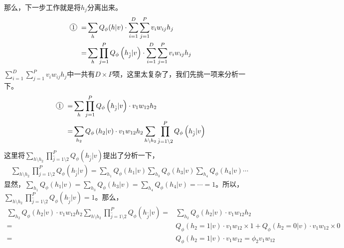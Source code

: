 \documentclass[a4paper]{article}
\newcommand*{\circled}[1]{\lower.7ex\hbox{\tikz\draw (0pt, 0pt)%
    circle (.5em) node {\makebox[1em][c]{\small #1}};}}
\begin{document}
那么，下一步工作就是将$h_j$分离出来。
\begin{equation}
    \begin{split}
        \circled{1} = & \sum_{h} Q_{\phi}(h | v) \cdot \sum_{i=1}^{D} \sum_{j=1}^{P} v_{i} w_{i j} h_{j} \\
        = & \sum_{h} \prod_{j=1}^{P} Q_{\phi}\left(h_{\hat{j}} | v\right) \cdot \sum_{i=1}^{D} \sum_{j=1}^{P} v_{i} w_{i j} h_{j}
    \end{split}
\end{equation}
$\sum_{i=1}^{D} \sum_{j=1}^{P} v_{i} w_{i j} h_{j}$中一共有$D\times P$项，这里太复杂了，我们先挑一项来分析一下。
\begin{equation}
    \begin{split}
        \circled{1} = & \sum_{h} \prod_{j=1}^{P} Q_{\phi}\left(h_{\hat{j}} | v\right) \cdot v_{1} w_{12} h_{2} \\
        = & \sum_{h_2} Q_{\phi}\left(h_{2} | v\right) \cdot v_{1} w_{12} h_{2} \sum_{h \setminus h_2} \prod_{\hat{j}=1\setminus 2}^{P} Q_{\phi}\left(h_{\hat{j}} | v\right) \\
    \end{split}
\end{equation}
这里将$\sum_{h \setminus h_2} \prod_{\hat{j}=1\setminus 2}^{P} Q_{\phi}\left(h_{\hat{j}} | v\right)$提出了分析一下，
\begin{equation}
    \begin{split}
       \sum_{h \setminus h_2} \prod_{\hat{j}=1\setminus 2}^{P} Q_{\phi}\left(h_{\hat{j}} | v\right) = \sum_{h_1} Q_{\phi}\left(h_{1} | v\right) \sum_{h_3} Q_{\phi}\left(h_{3} | v\right)\sum_{h_4} Q_{\phi}\left(h_{4} | v\right) \cdots
    \end{split}
\end{equation}
显然，$\sum_{h_1} Q_{\phi}\left(h_{1} | v\right) = \sum_{h_3} Q_{\phi}\left(h_{3} | v\right) = \sum_{h_4} Q_{\phi}\left(h_{4} | v\right) =\cdots = 1$。所以，$\sum_{h \setminus h_2} \prod_{\hat{j}=1\setminus 2}^{P} Q_{\phi}\left(h_{\hat{j}} | v\right) = 1$。那么，
\begin{equation}
\begin{split}
    \sum_{h_2} Q_{\phi}\left(h_{2} | v\right) \cdot v_{1} w_{12} h_{2} \sum_{h \setminus h_2} \prod_{\hat{j}=1\setminus 2}^{P} Q_{\phi}\left(h_{\hat{j}} | v\right) = & \sum_{h_2} Q_{\phi}\left(h_{2} | v\right) \cdot v_{1} w_{12} h_{2} \\
    = & Q_{\phi}\left(h_{2}=1 | v\right) \cdot v_{1} w_{12} \times 1 + Q_{\phi}\left(h_{2}=0 | v\right) \cdot v_{1} w_{12} \times 0 \\
    = & Q_{\phi}\left(h_{2}=1 | v\right) \cdot v_{1} w_{12} = \phi_2 v_{1} w_{12}
\end{split}
\end{equation}
\end{document}
